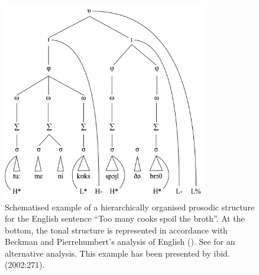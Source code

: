 \begin{figure}
  \centering 
   \includegraphics[width=0.8\textwidth]{figures/Figure_2_1.png}
  \caption{Schematised example of a hierarchically organised prosodic structure for the English sentence “Too many cooks spoil the broth”. At the bottom, the tonal structure is represented in accordance with Beckman and Pierrehumbert’s analysis of English (\citeyear{BeckmanPierr1986}). See \citet{Gussenhoven2002} for an alternative analysis. This example has been presented by ibid. (2002:271).}
   \label{fig:2.1}
   \end{figure}


